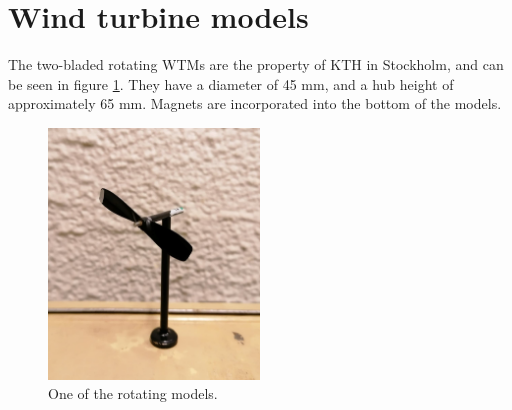 \section{Wind turbine models}
The two-bladed rotating \gls{WTM}s are the property of KTH in Stockholm, and can be seen in figure \ref{fig:rwtm}. They have a diameter of 45 \si{\mm}, and a hub height of approximately 65 \si{\mm}. Magnets are incorporated into the bottom of the models. 


\begin{figure} 
    \centering
    \includegraphics[width=0.5\textwidth]{0_Images/RWTM.jpg}    
    \caption{One of the rotating models.}
    \label{fig:rwtm}
\end{figure}

\FloatBarrier